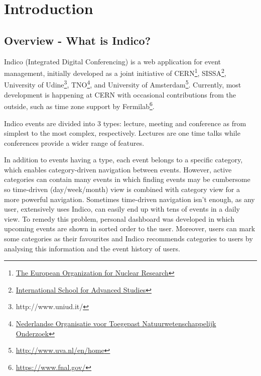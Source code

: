 \chapter{Introduction}

\section{Overview - What is Indico?}

Indico (Integrated Digital Conferencing) is a web application for event management, initially developed as a joint initiative of \textsc{CERN}\footnote{\href{http://home.web.cern.ch/}{The European Organization for Nuclear Research}}, \textsc{SISSA}\footnote{\href{https://www.sissa.it/}{International School for Advanced Studies}}, University of Udine\footnote{http://www.uniud.it/}, \textsc{TNO}\footnote{\href{https://www.tno.nl/}{Nederlandse Organisatie voor Toegepast Natuurwetenschappelijk Onderzoek}}, and University of Amsterdam\footnote{\url{http://www.uva.nl/en/home}}. Currently, most development is happening at CERN with occasional contributions from the outside, such as time zone support by Fermilab\footnote{\url{https://www.fnal.gov/}}.

\par Indico events are divided into 3 types: lecture, meeting and conference as from simplest to the most complex, respectively. Lectures are one time talks while conferences provide a wider range of features.

\par In addition to events having a type, each event belongs to a specific category, which enables category-driven navigation between events. However, active categories can contain many events in which finding events may be cumbersome so time-driven (day/week/month) view is combined with category view for a more powerful navigation. Sometimes time-driven navigation isn't enough, as any user, extensively uses Indico, can easily end up with tens of events in a daily view. To remedy this problem, personal dashboard was developed in which upcoming events are shown in sorted order to the user. Moreover, users can mark some categories as their favourites and Indico recommends categories to users by analysing this information and the event history of users.

